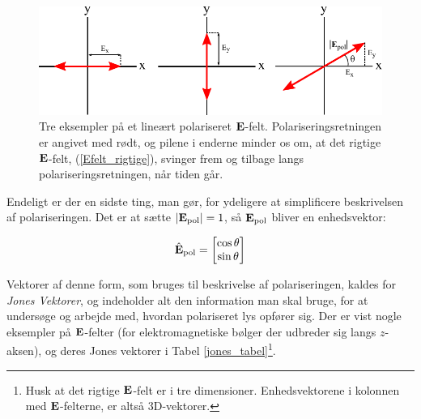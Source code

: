 \begin{figure}[h!]
	\centering
	\includegraphics[scale=1]{Elektrodynamik/Efelt_pol_fig.pdf}
	\caption{Tre eksempler på et lineært polariseret $\mathbf{E}$-felt. Polariseringsretningen er angivet med rødt, og pilene i enderne minder os om, at det rigtige $\mathbf{E}$-felt, (\ref{Efelt_rigtige}), svinger frem og tilbage langs polariseringsretningen, når tiden går.}
	\label{Efelt_pol}
\end{figure}

Endeligt er der en sidste ting, man gør, for ydeligere at simplificere beskrivelsen af polariseringen. Det er at sætte $| \mathbf{E}_{\text{pol}} | = 1$, så $\mathbf{E}_{\text{pol}}$ bliver en enhedsvektor:

\begin{equation}
\hat{\mathbf{E}}_{\text{pol}} = \begin{bmatrix} \cos \theta \\ \sin \theta \end{bmatrix}
\end{equation}

\vspace{2mm}

Vektorer af denne form, som bruges til beskrivelse af polariseringen, kaldes for \emph{Jones Vektorer}, og indeholder alt den information man skal bruge, for at undersøge og arbejde med, hvordan polariseret lys opfører sig. Der er vist nogle eksempler på $\mathbf{E}$-felter (for elektromagnetiske bølger der udbreder sig langs $z$-aksen), og deres Jones vektorer i Tabel \ref{jones_tabel}\footnote{Husk at det rigtige $\mathbf{E}$-felt er i tre dimensioner. Enhedsvektorene i kolonnen med $\mathbf{E}$-felterne, er altså 3D-vektorer.}.\\


